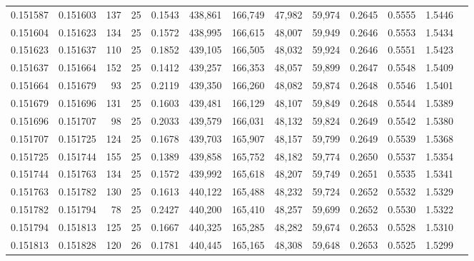 \begin{tabular}{rrrrrrrrrrrrr}
0.151587 & 0.151603 &   137 &  25 &                                     0.1543 & 438,861 & 166,749 &  47,982 &  59,974 & 0.2645 & 0.5555 & 1.5446 \\
0.151604 & 0.151623 &   134 &  25 &                                     0.1572 & 438,995 & 166,615 &  48,007 &  59,949 & 0.2646 & 0.5553 & 1.5434 \\
0.151623 & 0.151637 &   110 &  25 &                                     0.1852 & 439,105 & 166,505 &  48,032 &  59,924 & 0.2646 & 0.5551 & 1.5423 \\
0.151637 & 0.151664 &   152 &  25 &                                     0.1412 & 439,257 & 166,353 &  48,057 &  59,899 & 0.2647 & 0.5548 & 1.5409 \\
0.151664 & 0.151679 &    93 &  25 &                                     0.2119 & 439,350 & 166,260 &  48,082 &  59,874 & 0.2648 & 0.5546 & 1.5401 \\
0.151679 & 0.151696 &   131 &  25 &                                     0.1603 & 439,481 & 166,129 &  48,107 &  59,849 & 0.2648 & 0.5544 & 1.5389 \\
0.151696 & 0.151707 &    98 &  25 &                                     0.2033 & 439,579 & 166,031 &  48,132 &  59,824 & 0.2649 & 0.5542 & 1.5380 \\
0.151707 & 0.151725 &   124 &  25 &                                     0.1678 & 439,703 & 165,907 &  48,157 &  59,799 & 0.2649 & 0.5539 & 1.5368 \\
0.151725 & 0.151744 &   155 &  25 &                                     0.1389 & 439,858 & 165,752 &  48,182 &  59,774 & 0.2650 & 0.5537 & 1.5354 \\
0.151744 & 0.151763 &   134 &  25 &                                     0.1572 & 439,992 & 165,618 &  48,207 &  59,749 & 0.2651 & 0.5535 & 1.5341 \\
0.151763 & 0.151782 &   130 &  25 &                                     0.1613 & 440,122 & 165,488 &  48,232 &  59,724 & 0.2652 & 0.5532 & 1.5329 \\
0.151782 & 0.151794 &    78 &  25 &                                     0.2427 & 440,200 & 165,410 &  48,257 &  59,699 & 0.2652 & 0.5530 & 1.5322 \\
0.151794 & 0.151813 &   125 &  25 &                                     0.1667 & 440,325 & 165,285 &  48,282 &  59,674 & 0.2653 & 0.5528 & 1.5310 \\
0.151813 & 0.151828 &   120 &  26 &                                     0.1781 & 440,445 & 165,165 &  48,308 &  59,648 & 0.2653 & 0.5525 & 1.5299 \\

\end{tabular}
